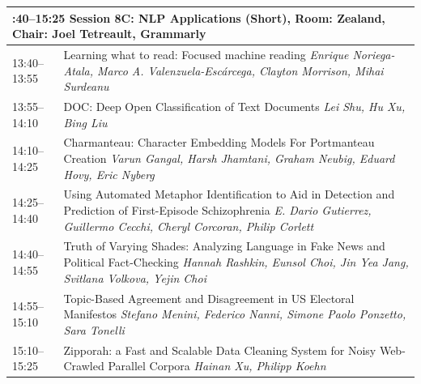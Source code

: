 \documentclass{book}
\renewcommand{\large}{\fontsize{72}{80}\selectfont}
\renewcommand{\large}{\fontsize{82}{90}\selectfont}
\begin{document}
\begin{tabular}{p{20cm}p{70cm}}
  \multicolumn{2}{p{\textwidth}}{\bfseries\large 13:40--15:25 Session 8C: NLP Applications (Short), Room:  Zealand, Chair:  Joel Tetreault, Grammarly} \\\hline

    
    13:40--13:55
    &	Learning what to read: Focused machine reading \newline 
    {\itshape Enrique Noriega-Atala, Marco A. Valenzuela-Escárcega, Clayton Morrison, Mihai Surdeanu} \\
    
    13:55--14:10
    &	DOC: Deep Open Classification of Text Documents \newline 
    {\itshape Lei Shu, Hu Xu, Bing Liu} \\
    
    14:10--14:25
    &	Charmanteau: Character Embedding Models For Portmanteau Creation \newline 
    {\itshape Varun Gangal, Harsh Jhamtani, Graham Neubig, Eduard Hovy, Eric Nyberg} \\
    
    14:25--14:40
    &	Using Automated Metaphor Identification to Aid in Detection and Prediction of First-Episode Schizophrenia \newline 
    {\itshape E. Dario Gutierrez, Guillermo Cecchi, Cheryl Corcoran, Philip Corlett} \\
    
    14:40--14:55
    &	Truth of Varying Shades: Analyzing Language in Fake News and Political Fact-Checking \newline 
    {\itshape Hannah Rashkin, Eunsol Choi, Jin Yea Jang, Svitlana Volkova, Yejin Choi} \\
    
    14:55--15:10
    &	Topic-Based Agreement and Disagreement in US Electoral Manifestos \newline 
    {\itshape Stefano Menini, Federico Nanni, Simone Paolo Ponzetto, Sara Tonelli} \\
    
    15:10--15:25
    &	Zipporah: a Fast and Scalable Data Cleaning System for Noisy Web-Crawled Parallel Corpora \newline 
    {\itshape Hainan Xu, Philipp Koehn} \\
    
\end{tabular}
\vspace*{\fill}
\end{document}

